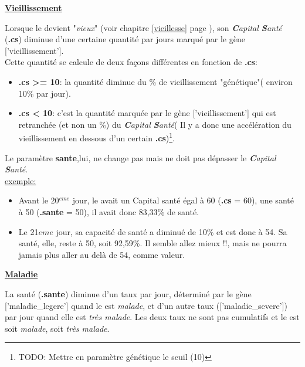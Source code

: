\documentclass[french]{report}
\begin{document}
\begin{center}
\underline{\textbf{Vieillissement}}\label{vieillissement}
\end{center}
Lorsque le \CoCiX devient "\textit{vieux}" (voir chapitre \ref{vieillesse} page \pageref{vieillesse}), son \textit{\textbf{C}apital \textbf{S}anté} (\textbf{.cs}) diminue d'une certaine quantité par jours marqué par le gène ['vieillissement'].\\
Cette quantité se calcule de deux façons différentes en fonction de \textbf{.cs}:
\begin{itemize}
	\item \textbf{.cs >= 10}: la quantité diminue du \% de vieillissement "génétique"( environ 10\% par jour).
	\item \textbf{.cs < 10}: c'est la quantité marquée par le gène ['vieillissement'] qui est retranchée (et non un \%) du \textit{\textbf{C}apital \textbf{S}anté}( Il y a donc une accélération du vieillissement en dessous d'un certain \textbf{.cs})\footnote{TODO: Mettre en paramètre génétique le seuil (10)}.\\
\end{itemize}

Le paramètre \textbf{sante},lui, ne change pas mais ne doit pas dépasser le \textit{\textbf{C}apital \textbf{S}anté}.\\

\underline{exemple:}\\
\begin{itemize}
\item Avant le 20$^{eme}$ jour, le \CoCiX avait un Capital santé égal à  60 (\textbf{.cs} = 60), une santé à 50 (\textbf{.sante} = 50), il avait donc 83,33\% de santé.\\

\item Le 21${eme}$ jour, sa capacité de santé a diminué de 10\% et est donc à 54. Sa santé, elle, reste à 50, soit 92,59\%. Il semble allez mieux !!, mais ne pourra jamais plus aller au delà de 54, comme valeur.\\
\end{itemize}
\begin{center}
\underline{\textbf{Maladie}}\label{maladie}
\end{center}

La santé (\textbf{.sante}) diminue d'un taux par jour, déterminé par le gène ['maladie\_legere'] quand le \CoCiX est \textit{malade}, et d'un autre taux (['maladie\_severe']) par jour quand elle est \textit{très malade}. Les deux taux ne sont pas cumulatifs et le \CoCiX est soit \textit{malade}, soit \textit{très malade}.
\end{document}
